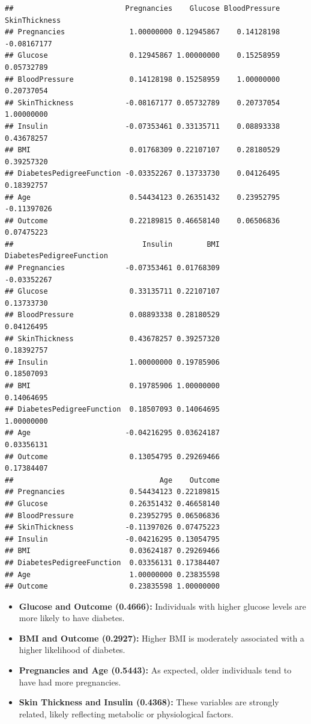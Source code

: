 \documentclass[
]{article}
\providecommand{\tightlist}{%
  \setlength{\itemsep}{0pt}\setlength{\parskip}{0pt}}
\begin{document}
\begin{verbatim}
##                          Pregnancies    Glucose BloodPressure SkinThickness
## Pregnancies               1.00000000 0.12945867    0.14128198   -0.08167177
## Glucose                   0.12945867 1.00000000    0.15258959    0.05732789
## BloodPressure             0.14128198 0.15258959    1.00000000    0.20737054
## SkinThickness            -0.08167177 0.05732789    0.20737054    1.00000000
## Insulin                  -0.07353461 0.33135711    0.08893338    0.43678257
## BMI                       0.01768309 0.22107107    0.28180529    0.39257320
## DiabetesPedigreeFunction -0.03352267 0.13733730    0.04126495    0.18392757
## Age                       0.54434123 0.26351432    0.23952795   -0.11397026
## Outcome                   0.22189815 0.46658140    0.06506836    0.07475223
##                              Insulin        BMI DiabetesPedigreeFunction
## Pregnancies              -0.07353461 0.01768309              -0.03352267
## Glucose                   0.33135711 0.22107107               0.13733730
## BloodPressure             0.08893338 0.28180529               0.04126495
## SkinThickness             0.43678257 0.39257320               0.18392757
## Insulin                   1.00000000 0.19785906               0.18507093
## BMI                       0.19785906 1.00000000               0.14064695
## DiabetesPedigreeFunction  0.18507093 0.14064695               1.00000000
## Age                      -0.04216295 0.03624187               0.03356131
## Outcome                   0.13054795 0.29269466               0.17384407
##                                  Age    Outcome
## Pregnancies               0.54434123 0.22189815
## Glucose                   0.26351432 0.46658140
## BloodPressure             0.23952795 0.06506836
## SkinThickness            -0.11397026 0.07475223
## Insulin                  -0.04216295 0.13054795
## BMI                       0.03624187 0.29269466
## DiabetesPedigreeFunction  0.03356131 0.17384407
## Age                       1.00000000 0.23835598
## Outcome                   0.23835598 1.00000000
\end{verbatim}

\begin{itemize}
\tightlist
\item
  \textbf{Glucose and Outcome (0.4666):} Individuals with higher glucose
  levels are more likely to have diabetes.\\
\item
  \textbf{BMI and Outcome (0.2927):} Higher BMI is moderately associated
  with a higher likelihood of diabetes.\\
\item
  \textbf{Pregnancies and Age (0.5443):} As expected, older individuals
  tend to have had more pregnancies.\\
\item
  \textbf{Skin Thickness and Insulin (0.4368):} These variables are
  strongly related, likely reflecting metabolic or physiological
  factors.
\end{itemize}
\end{document}
